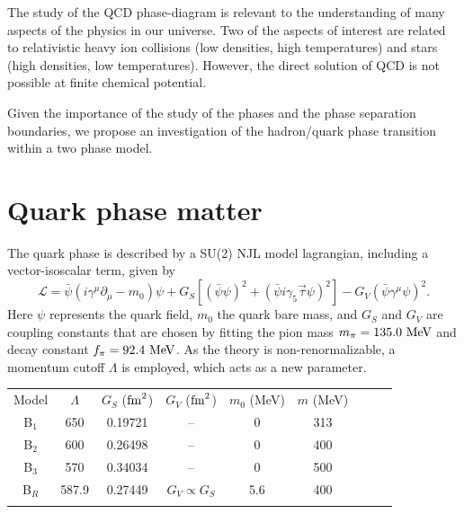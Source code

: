 \documentclass{ws-ijmpcs}
\begin{document}
The study of the QCD phase-diagram is relevant to the understanding of many aspects of the physics in our universe. Two of the aspects of interest are related to relativistic heavy ion collisions (low densities, high temperatures) and stars (high densities, low temperatures). However, the direct solution of QCD is not possible at finite chemical potential.

Given the importance of the study of the phases and the phase separation boundaries, we propose an investigation of the hadron/quark phase transition within a two phase model.

\section{Quark phase matter}

The quark phase is described by a SU(2) NJL model lagrangian, including a vector-isoscalar term, given by\cite{Buballa2005}
\begin{equation}\label{Eq:LagNJL-SU2-Bub}
	\mathcal{L} =\bar{\psi}(i\gamma^\mu\partial_\mu - m_0)\psi + G_S[(\bar{\psi}\psi)^2 + (\bar{\psi}i\gamma_5\vec{\tau}\psi)^2] - G_V(\bar{\psi}\gamma^\mu \psi)^2.
\end{equation}
%
Here $\psi$ represents the quark field, $m_0$ the quark bare mass, and $G_S$ and $G_V$ are coupling constants that are chosen by fitting the pion mass $m_\pi = 135.0~\rm{MeV}$ and decay constant $f_\pi = 92.4~\rm{MeV}$. As the theory is non-renormalizable, a momentum cutoff $\Lambda$ is employed, which acts as a new parameter.

\begin{table}[!ht]
{\begin{tabular}{@{}ccccccccc@{}}\toprule
Model &  $\Lambda$ & $G_S$ ($\rm{fm}^2$) & $G_V$ ($\rm{fm}^2$) & $m_0$ (MeV) & $m$ (MeV) \\ \colrule
B$_1$ & 650 & 0.19721 & -- & 0 & 313 \\
B$_2$ & 600 & 0.26498 & -- & 0 & 400 \\
B$_3$ & 570 & 0.34034 & -- & 0 & 500 \\
B$_R$ & 587.9 & 0.27449 & $G_V \propto G_S$ & 5.6 & 400\\
\botrule
\end{tabular} \label{Tab:Parametros_NJL}}
\end{table}
\end{document}
